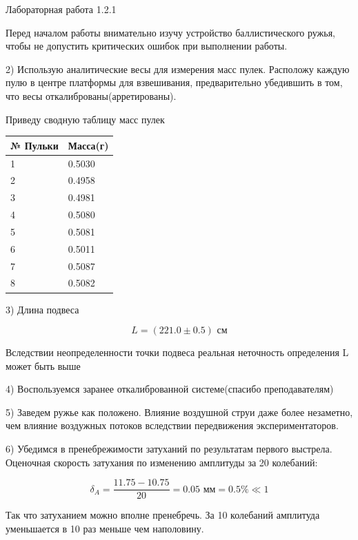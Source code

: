 \documentclass{astroedu-lab}
\begin{document}
\begin{problem}{\large Лабораторная работа 1.2.1}
\begin{center}
\label{fig:mpr}

\end{center}

Перед началом работы внимательно изучу устройство баллистического ружья, чтобы не допустить критических ошибок при выполнении работы.


2) Использую аналитические весы для измерения масс пулек. Расположу каждую пулю в центре платформы для взвешивания, предварительно убедившить в том, что весы откалиброваны(арретированы).

Приведу сводную таблицу масс пулек

\begin{center}
\begin{tabular}[t]{|l|l|}

\hline
№ Пульки & Масса(г) \\
\hline
1 & 0.5030 \\
2 & 0.4958 \\
3 & 0.4981 \\
4 & 0.5080 \\
\hline
5 & 0.5081 \\
6 & 0.5011 \\
7 & 0.5087 \\
8 & 0.5082 \\
\hline
\end{tabular}
\end{center}

3) Длина подвеса

\begin{equation}
	L = (221.0 \pm 0.5)\text{ см}
\end{equation}

Вследствии неопределенности точки подвеса реальная неточность определения L может быть выше

4) Воспользуемся заранее откалиброванной системе(спасибо преподавателям)

5) Заведем ружье как положено. Влияние воздушной струи даже более незаметно, чем влияние воздужных потоков вследствии передвижения экспериментаторов.

6) Убедимся в пренебрежимости затуханий по результатам первого выстрела. Оценочная скорость затухания по изменению амплитуды за 20 колебаний:

\begin{equation}
	\delta_A = \frac{11.75 - 10.75}{20} = 0.05 \text{ мм} = 0.5 \% \ll 1
\end{equation}

Так что затуханием можно вполне пренебречь. За 10 колебаний амплитуда уменьшается в 10 раз меньше чем наполовину.


\end{problem}
\end{document}
